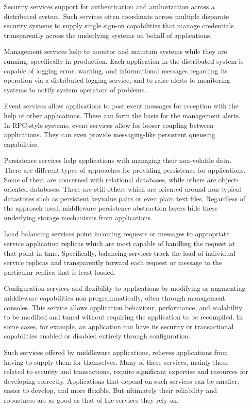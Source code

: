\documentclass{acm_proc_article-sp}
\begin{document}
Security services support for authentication and  authorization across a distributed system. Such services often coordinate across multiple disparate security systems to supply single sign-on capabilities that manage credentials transparently across the underlying systems on behalf of applications.

Management services help to monitor and maintain systems while they are running, specifically in production. Each application in the distributed system is capable of logging error, warning, and informational messages regarding its operation via a distributed logging service, and to raise alerts to monitoring systems to notify system operators of problems.

Event services allow applications to post event messages for reception with the help of other applications. These can form the basis for the management alerts. In RPC-style systems, event
services allow for looser coupling between applications. They can even provide messaging-like persistent queueing capabilities.

Persistence services help applications with managing their non-volatile data. There are different types of approaches for providing persistence for applications. Some of them are concerned with relational databases, while others are object-oriented databases. There are  still others which are oriented around  non-typical datastores such as persistent keyvalue pairs or even plain text files. Regardless of the approach  used, middleware persistence abstraction layers hide these underlying storage mechanisms from applications.

Load balancing services point incoming requests or messages to appropriate service application replicas which are most capable of handling the request at that point in time. Specifically, balancing services track the load of individual service replicas and transparently forward each request or message to the particular replica that is least loaded.

Configuration services add flexibility to applications by modifying or augmenting middleware capabilities non programmatically, often through management consoles. This service allows application behaviour, performance, and scalability to be modified and tuned without requiring the application to be recompiled. In some cases, for example, an application can have its security or transactional capabilities enabled or disabled entirely through configuration.

Such services offered by middleware applications, relieves applications from having to supply them for themselves. Many of these services, mainly those related to security and transactions, require significant expertise and resources for developing correctly. Applications that depend on such services can be smaller, easier to develop, and more flexible. But ultimately their reliability and robustness are  as good as that of the services they rely on.
\end{document}

